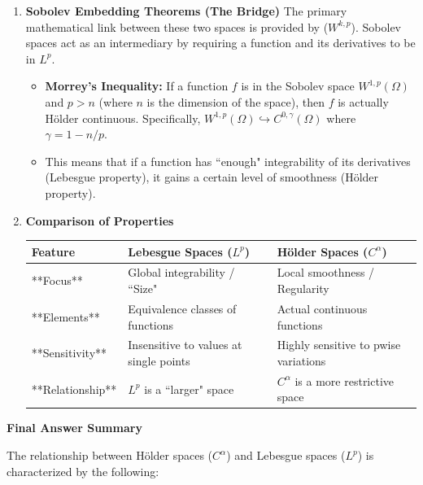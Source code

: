 \documentclass[12pt,a4paper]{report}
\begin{document}
\begin{description}
\begin{enumerate}
\begin{itemize}
\item \textbf{Lebesgue does not imply Hölder:} A function in $L^p$ can be discontinuous or even unbounded at certain points (e.g., $f(x) = x^{-1/4}$ is in $L^2(0,1)$ but is not continuous, let alone Hölder continuous).

\end{itemize}

\item  \textbf{Sobolev Embedding Theorems (The Bridge)}
The primary mathematical link between these two spaces is provided by  ($W^{k,p}$). Sobolev spaces act as an intermediary by requiring a function and its derivatives to be in $L^p$.

\begin{itemize}

	\item \textbf{Morrey's Inequality:} If a function $f$ is in the Sobolev space $W^{1,p}(\Omega)$ and $p > n$ (where $n$ is the dimension of the space), then $f$ is actually Hölder continuous. Specifically, $W^{1,p}(\Omega) \hookrightarrow C^{0, \gamma}(\Omega)$ where $\gamma = 1 - n/p$.
	\item This means that if a function has ``enough" integrability of its derivatives (Lebesgue property), it gains a certain level of smoothness (Hölder property).
\end{itemize}

\item  \textbf{Comparison of Properties}

\begin{tabular}{|l|l|l|}
	\hline
	Feature & Lebesgue Spaces ($L^p$) & Hölder Spaces ($C^\alpha$) \\
	\hline
	**Focus** & Global integrability / ``Size" & Local smoothness / Regularity \\
	\hline
	**Elements** & Equivalence classes of functions & Actual continuous functions \\
	\hline
	**Sensitivity** & Insensitive to values at single points & Highly sensitive to pwise variations \\
	\hline
	**Relationship** & $L^p$ is a ``larger" space & $C^\alpha$ is a more restrictive space \\
	\hline
\end{tabular}

\end{enumerate} 

\textbf{Final Answer Summary}

The relationship between Hölder spaces ($C^\alpha$) and Lebesgue spaces ($L^p$) is characterized by the following:


\end{description}
\end{document}
